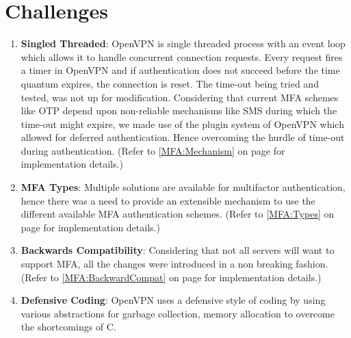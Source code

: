 \documentclass[11pt,oneside]{book}
\begin{document}
\section{Challenges}
\begin{enumerate}
    \item \textbf{Singled Threaded}: OpenVPN is single threaded process with an event loop which
        allows it to handle concurrent connection requests. Every request fires a timer in OpenVPN
        and if authentication does not succeed before the time quantum expires, the connection is
        reset. The time-out being tried and tested, was not up for modification.
        Considering that current MFA schemes like OTP depend upon non-reliable mechanisms like
        SMS during which the time-out might expire, we made use of the plugin system of OpenVPN
        which allowed for deferred authentication. Hence overcoming the hurdle of time-out
        during authentication.
        (Refer to \ref{MFA:Mechanism} on page \pageref{MFA:Mechanism} for implementation details.)
    \item \textbf{MFA Types}: Multiple solutions are available for multifactor authentication, hence
        there was a need to provide an extensible mechanism to use the different available MFA
        authentication schemes. (Refer to \ref{MFA:Types} on page \pageref{MFA:Types} for
        implementation details.)
    \item \textbf{Backwards Compatibility}: Considering that not all servers will want to support
        MFA, all the changes were introduced in a non breaking fashion.
        (Refer to \ref{MFA:BackwardCompat} on page \pageref{MFA:BackwardCompat} for implementation details.)
    \item \textbf{Defensive Coding}: OpenVPN uses a defensive style of coding by using various
        abstractions for garbage collection, memory allocation to overcome the shortcomings of C.
\end{enumerate}
\end{document}
